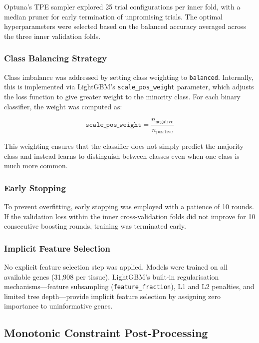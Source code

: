Optuna's TPE sampler explored 25 trial configurations per inner fold, with a median pruner for early termination of unpromising trials. The optimal hyperparameters were selected based on the balanced accuracy averaged across the three inner validation folds.

\subsubsection{Class Balancing Strategy}

Class imbalance was addressed by setting class weighting to \texttt{balanced}. Internally, this is implemented via LightGBM's \texttt{scale\_pos\_weight} parameter, which adjusts the loss function to give greater weight to the minority class. For each binary classifier, the weight was computed as:

\begin{equation}
    \texttt{scale\_pos\_weight} = \frac{n_{\text{negative}}}{n_{\text{positive}}}
    \label{eq:class_weight}
\end{equation}

This weighting ensures that the classifier does not simply predict the majority class and instead learns to distinguish between classes even when one class is much more common.

\subsubsection{Early Stopping}

To prevent overfitting, early stopping was employed with a patience of 10 rounds. If the validation loss within the inner cross-validation folds did not improve for 10 consecutive boosting rounds, training was terminated early.

\subsubsection{Implicit Feature Selection}

No explicit feature selection step was applied. Models were trained on all available genes (31,908 per tissue). LightGBM's built-in regularisation mechanisms---feature subsampling (\texttt{feature\_fraction}), L1 and L2 penalties, and limited tree depth---provide implicit feature selection by assigning zero importance to uninformative genes.

\subsection{Monotonic Constraint Post-Processing}

